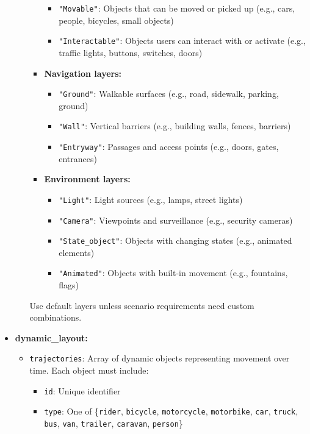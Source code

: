 \documentclass{article}
\begin{document}
\begin{tcolorbox}[examplebox, title=Scene Specification Format]
\begin{itemize}
\begin{itemize}
\begin{itemize}
\begin{itemize}
                \item \texttt{"Movable"}: Objects that can be moved or picked up (e.g., cars, people, bicycles, small objects)
                \item \texttt{"Interactable"}: Objects users can interact with or activate (e.g., traffic lights, buttons, switches, doors)
            \end{itemize}
            \item \textbf{Navigation layers:}
            \begin{itemize}
                \item \texttt{"Ground"}: Walkable surfaces (e.g., road, sidewalk, parking, ground)
                \item \texttt{"Wall"}: Vertical barriers (e.g., building walls, fences, barriers)
                \item \texttt{"Entryway"}: Passages and access points (e.g., doors, gates, entrances)
            \end{itemize}
            \item \textbf{Environment layers:}
            \begin{itemize}
                \item \texttt{"Light"}: Light sources (e.g., lamps, street lights)
                \item \texttt{"Camera"}: Viewpoints and surveillance (e.g., security cameras)
                \item \texttt{"State\_object"}: Objects with changing states (e.g., animated elements)
                \item \texttt{"Animated"}: Objects with built-in movement (e.g., fountains, flags)
            \end{itemize}
        \end{itemize}
        Use default layers unless scenario requirements need custom combinations.
    \end{itemize}
    \item \textbf{dynamic\_layout:}
    \begin{itemize}
        \item \texttt{trajectories}: Array of dynamic objects representing movement over time. Each object must include:
        \begin{itemize}
            \item \texttt{id}: Unique identifier
            \item \texttt{type}: One of \{\texttt{rider}, \texttt{bicycle}, \texttt{motorcycle}, \texttt{motorbike}, \texttt{car}, \texttt{truck}, \texttt{bus}, \texttt{van}, \texttt{trailer}, \texttt{caravan}, \texttt{person}\}

\end{itemize}
\end{itemize}
\end{itemize}
\end{tcolorbox}
\end{document}

